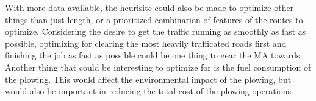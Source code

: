 With more data available, the heurisitc could also be made to optimize other things than just length, or a prioritized combination of features of the routes to optimize. Considering the desire to get the traffic running as smoothly as fast as possible, optimizing for clearing the most heavily trafficated roads first and finishing the job as fast as possible could be one thing to gear the MA towards. Another thing that could be interesting to optimize for is the fuel consumption of the plowing. This would affect the environmental impact of the plowing, but would also be important in reducing the total cost of the plowing operations.




\cleardoublepage
